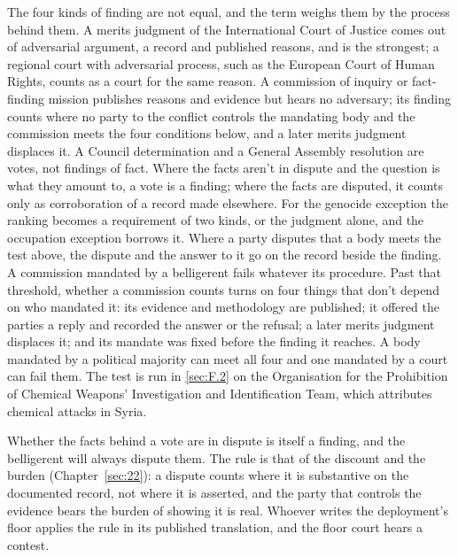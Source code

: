 The four kinds of finding are not equal, and the term weighs them by the process behind them. A merits judgment of the International Court of Justice comes out of adversarial argument, a record and published reasons, and is the strongest; a regional court with adversarial process, such as the European Court of Human Rights, counts as a court for the same reason. A commission of inquiry or fact-finding mission publishes reasons and evidence but hears no adversary; its finding counts where no party to the conflict controls the mandating body and the commission meets the four conditions below, and a later merits judgment displaces it. A Council determination and a General Assembly resolution are votes, not findings of fact. Where the facts aren't in dispute and the question is what they amount to, a vote is a finding; where the facts are disputed, it counts only as corroboration of a record made elsewhere. For the genocide exception the ranking becomes a requirement of two kinds, or the judgment alone, and the occupation exception borrows it. Where a party disputes that a body meets the test above, the dispute and the answer to it go on the record beside the finding. A commission mandated by a belligerent fails whatever its procedure. Past that threshold, whether a commission counts turns on four things that don't depend on who mandated it: its evidence and methodology are published; it offered the parties a reply and recorded the answer or the refusal; a later merits judgment displaces it; and its mandate was fixed before the finding it reaches. A body mandated by a political majority can meet all four and one mandated by a court can fail them. The test is run in \ref{sec:F.2} on the Organisation for the Prohibition of Chemical Weapons' Investigation and Identification Team, which attributes chemical attacks in Syria.

Whether the facts behind a vote are in dispute is itself a finding, and the belligerent will always dispute them. The rule is that of the discount and the burden (Chapter~\ref{sec:22}): a dispute counts where it is substantive on the documented record, not where it is asserted, and the party that controls the evidence bears the burden of showing it is real. Whoever writes the deployment's floor applies the rule in its published translation, and the floor court hears a contest.
